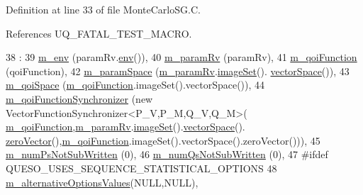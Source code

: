 Definition at line 33 of file Monte\-Carlo\-S\-G.\-C.



References U\-Q\-\_\-\-F\-A\-T\-A\-L\-\_\-\-T\-E\-S\-T\-\_\-\-M\-A\-C\-R\-O.


\begin{DoxyCode}
38   :
39   \hyperlink{class_q_u_e_s_o_1_1_monte_carlo_s_g_a30055a359b22cde54681679aed8ae6e7}{m\_env}                     (paramRv.\hyperlink{class_q_u_e_s_o_1_1_base_vector_r_v_ad5bf8486b3bacb46b9d4ecba513fd37b}{env}()),
40   \hyperlink{class_q_u_e_s_o_1_1_monte_carlo_s_g_a938acc7072543d727fe35fa0f5d9013f}{m\_paramRv}                 (paramRv),
41   \hyperlink{class_q_u_e_s_o_1_1_monte_carlo_s_g_ae0c3b848d58b4f79d5e3741e70fbcd78}{m\_qoiFunction}             (qoiFunction),
42   \hyperlink{class_q_u_e_s_o_1_1_monte_carlo_s_g_a64620f0dd80c96f86918e1d711767b6f}{m\_paramSpace}              (\hyperlink{class_q_u_e_s_o_1_1_monte_carlo_s_g_a938acc7072543d727fe35fa0f5d9013f}{m\_paramRv}.\hyperlink{class_q_u_e_s_o_1_1_base_vector_r_v_aa4dd2f036228eac1f945bacc7147a922}{imageSet}().
      \hyperlink{class_q_u_e_s_o_1_1_vector_set_a923421590baf5bf93cf066e528f927dc}{vectorSpace}()),
43   \hyperlink{class_q_u_e_s_o_1_1_monte_carlo_s_g_a1df92e2ff2e7fa19d4ea158e71670ca3}{m\_qoiSpace}                (\hyperlink{class_q_u_e_s_o_1_1_monte_carlo_s_g_ae0c3b848d58b4f79d5e3741e70fbcd78}{m\_qoiFunction}.imageSet().vectorSpace()),
44   \hyperlink{class_q_u_e_s_o_1_1_monte_carlo_s_g_a5a55a6fa3562ec8253089ac242bc52ba}{m\_qoiFunctionSynchronizer} (\textcolor{keyword}{new} VectorFunctionSynchronizer<P\_V,P\_M,Q\_V,Q\_M>(
      \hyperlink{class_q_u_e_s_o_1_1_monte_carlo_s_g_ae0c3b848d58b4f79d5e3741e70fbcd78}{m\_qoiFunction},\hyperlink{class_q_u_e_s_o_1_1_monte_carlo_s_g_a938acc7072543d727fe35fa0f5d9013f}{m\_paramRv}.\hyperlink{class_q_u_e_s_o_1_1_base_vector_r_v_aa4dd2f036228eac1f945bacc7147a922}{imageSet}().\hyperlink{class_q_u_e_s_o_1_1_vector_set_a923421590baf5bf93cf066e528f927dc}{vectorSpace}().
      \hyperlink{class_q_u_e_s_o_1_1_vector_space_a92e963bb5cab3eecd290dfe4b8f03b04}{zeroVector}(),\hyperlink{class_q_u_e_s_o_1_1_monte_carlo_s_g_ae0c3b848d58b4f79d5e3741e70fbcd78}{m\_qoiFunction}.imageSet().vectorSpace().zeroVector())),
45   \hyperlink{class_q_u_e_s_o_1_1_monte_carlo_s_g_a1bd46f12e850ab8d239205aafdae72af}{m\_numPsNotSubWritten}      (0),
46   \hyperlink{class_q_u_e_s_o_1_1_monte_carlo_s_g_af1d99dc1a3384fd294da7464ba1bda5f}{m\_numQsNotSubWritten}      (0),
47 \textcolor{preprocessor}{#ifdef QUESO\_USES\_SEQUENCE\_STATISTICAL\_OPTIONS}
48 \textcolor{preprocessor}{}  \hyperlink{class_q_u_e_s_o_1_1_monte_carlo_s_g_a7f83d2e651b4de98ae3d2ccc924e23aa}{m\_alternativeOptionsValues}(NULL,NULL),

\end{DoxyCode}
